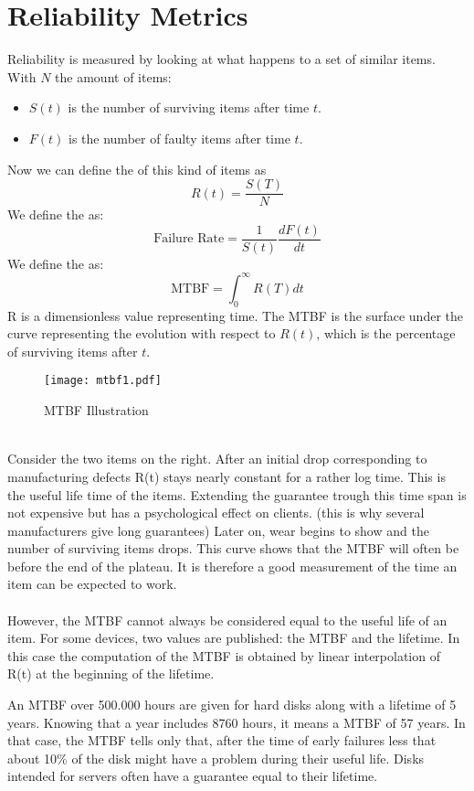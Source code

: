 \documentclass[../main.tex]{subfiles}
\begin{document}
\section{Reliability Metrics}
Reliability is measured by looking at what happens to a set of similar items. With $N$ the amount of items:
\begin{itemize}
	\item $S(t)$ is the number of surviving items after time $t$.
	\item $F(t)$ is the number of faulty items after time $t$.
\end{itemize}
Now we can define the  of this kind of items as 
\[
R(t) = \frac{S(T)}{N}
\]
We define the  as:
\[
\text{Failure Rate} = \frac{1}{S(t)} \frac{dF(t)}{dt}
\]
We define the  as:
\[
\text{MTBF} = \int_0^{\infty} R(T) dt
\]
R is a dimensionless value representing time. The MTBF is the surface under the curve representing the evolution with respect to $R(t)$, which is the percentage of surviving items after $t$.
\begin{figure}[h!]
    \centering
    \texttt{[image: mtbf1.pdf]}
    \caption{MTBF Illustration}
    \label{mtbf1}
\end{figure}
\\
Consider the two items on the right. After an initial drop corresponding to manufacturing defects R(t) stays nearly constant for a rather log time. This is the useful life time of the items. Extending the guarantee trough this time span is not expensive but has a psychological effect on clients. (this is why several manufacturers give long guarantees)
Later on, wear begins to show and the number of surviving items drops. This curve shows that the MTBF will often be before the end of the plateau. It is therefore a good measurement of the time an item can be expected to work.
\\\\
However, the MTBF cannot always be considered equal to the useful life of an item. For some devices, two values are published: the MTBF and the lifetime. In this case the computation of the MTBF is obtained by linear interpolation of R(t) at the beginning of the lifetime.

\begin{exmp}
An MTBF over 500.000 hours are given for hard disks along with a lifetime of 5 years. Knowing that a year includes 8760 hours, it means a MTBF of 57 years. In that case, the MTBF tells only that, after the time of early failures less that about 10\% of the disk might have a problem during their useful life. Disks intended for servers often have a guarantee equal to their lifetime.
\end{exmp}
\end{document}
